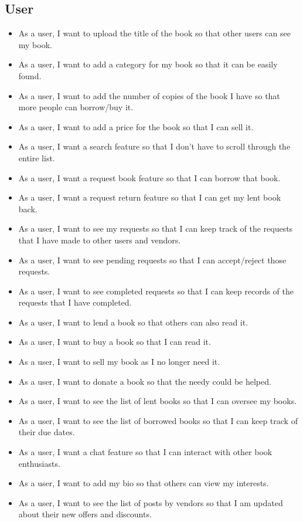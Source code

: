 \documentclass[conference]{IEEEtran}
\begin{document}
\subsection{User}
\begin{itemize}
    \item As a user, I want to upload the title of the book so that other users can see my book.
\item As a user, I want to add a category for my book so that it can be easily found.
\item As a user, I want to add the number of copies of the book I have so that more people can borrow/buy it.
\item As a user, I want to add a price for the book so that I can sell it.
\item As a user, I want a search feature so that I don’t have to scroll through the entire list.
\item As a user, I want a request book feature so that I can borrow that book.
\item As a user, I want a request return feature so that I can get my lent book back.
\item As a user, I want to see my requests so that I can keep track of the requests that I have made to other users and vendors.
\item As a user, I want to see pending requests so that I can accept/reject those requests.
\item As a user, I want to see completed requests so that I can keep records of the requests that I have completed.
\item As a user, I want to lend a book so that others can also read it.
\item As a user, I want to buy a book so that I can read it.
\item As a user, I want to sell my book as I no longer need it.
\item As a user, I want to donate a book so that the needy could be helped.
\item As a user, I want to see the list of lent books so that I can oversee my books.
\item As a user, I want to see the list of borrowed books so that I can keep track of their due dates.
\item As a user, I want a chat feature so that I can interact with other book enthusiasts.
\item As a user, I want to add my bio so that others can view my interests.
\item As a user, I want to see the list of posts by vendors so that I am updated about their new offers and discounts.
\end{itemize}
\end{document}
